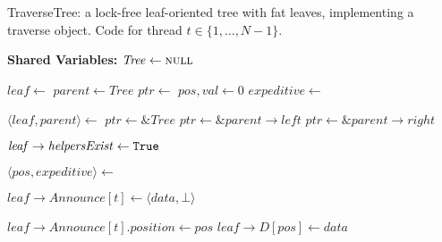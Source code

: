     \begin{algorithm}[htbp]
        \footnotesize
        \caption{TraverseTree: a lock-free leaf-oriented tree with fat leaves, implementing a traverse object.
         Code for thread $t \in \{ 1, \ldots, N-1\}$.}
        \label{alg:tree}
        \begin{algorithmic}[1]
    
            \Statex \textbf{Shared Variables:}
            \State $\mathit{Tree} \gets \mbox{\sc null}$ 
    
                \State $\mathit{leaf} \gets$ \NULL
                \State $\mathit{parent} \gets \mathit{Tree}$
                \State $\mathit{ptr} \gets$ \NULL
                \State $\mathit{pos}, \mathit{val} \gets 0$
                \State $\mathit{expeditive} \gets$ \False
    
                \While{\True} \label{alg:tree:while}
                    \State $\langle \mathit{leaf, parent} \rangle \gets$  \label{alg:tree:search}
                     \label{alg:tree:ptr-parent:null}
                        \State $\mathit{ptr} \gets \&\mathit{Tree}$
                        \State $\mathit{ptr} \gets \&\mathit{parent} \rightarrow \mathit{left}$ \label{alg:tree:ptr-left}
                    \Else
                        \State $\mathit{ptr} \gets \&\mathit{parent} \rightarrow \mathit{right}$ \label{alg:tree:ptr-right}
                    \EndIf
    
                        \State $\mathit{leaf} \rightarrow \mathit{helpersExist} \gets \mbox{\texttt{True}}$ \label{alg:tree:switch-mode:}
                    \EndIf
    
                    \State $\langle \mathit{pos, expeditive} \rangle \gets$  \label{alg:tree:get-pos}
    
                        \State $\mathit{leaf} \rightarrow \mathit{Announce}[t] \gets \langle \mathit{data, \bot} \rangle$ \label{alg:tree:announce:op}
                    \EndIf
    
                     \label{alg:tree:pos-in-D}
                            \State $\mathit{leaf} \rightarrow \mathit{Announce}[t].\mathit{position} \gets \mathit{pos}$ \label{alg:tree:announce:pos-in-D}
                        \EndIf
                        \State $\mathit{leaf} \rightarrow \mathit{D}[\mathit{pos}] \gets \mathit{data}$ \label{alg:tree:store-in-D}
                    \Else \label{alg:tree:pos-not-in-D}
                        \State {}
                    \EndIf
    

\end{algorithmic}
\end{algorithm}
